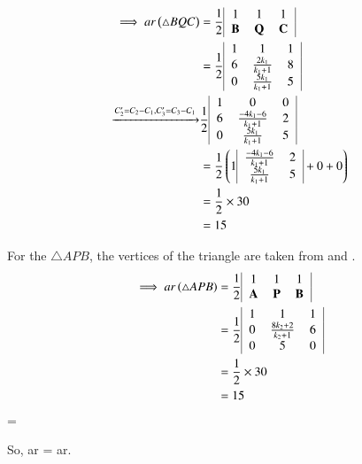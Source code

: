 \begin{align}
\implies ar\brak{\triangle BQC}&=
\frac{1}{2}\begin{tabular}{|c c c|}            
1 &1&1\\                      
$\vec{B}$&$\vec{Q}$&$\vec{C}$\\    
\end{tabular}\\
&= \frac{1}{2}\begin{tabular}{|c c c|}
       1 &1&1\\
       6&$\frac{2k_1}{k_1+1}$&8 \\
       0&$\frac{5k_1}{k_1+1}$&5
   \end{tabular}\\
  \xrightarrow{C_2'=C_2-C_1,C_3'=C_3-C_1}&\frac{1}{2} \begin{tabular}{|c c c|}
       1 &0&0\\
       6&$\frac{-4k_1-6}{k_1+1}$&2 \\
       0&$\frac{5k_1}{k_1+1}$&5
   \end{tabular}\\
&=\frac{1}{2}\brak{1\begin{tabular}{|c c|}
   $\frac{-4k_1-6}{k_1+1}$ &2  \\
   $\frac{5k_1}{k_1+1}$ & 5
\end{tabular} +0+0}\\
&=\frac{1}{2} \times30\\                          
&=15 \end{align}


For the $\triangle APB$, the vertices of the triangle are taken from  and .
   \begin{align}
  \implies ar\brak{\triangle APB} &=
\frac{1}{2}\begin{tabular}{|c c c|}            
1 &1&1\\                            
$\vec{A}$&$\vec{P}$&$\vec{B}$\\
\end{tabular}\\ &=  \frac{1}{2}
   \begin{tabular}{|c c c|}
       1 &1&1\\
       0&$\frac{8k_2+2}{k_2+1}$&6 \\
       0&5&0
   \end{tabular}\\
 &=\frac{1}{2} \times30\\
 &=15 \end{align}
  = 


So, ar = ar.
%


